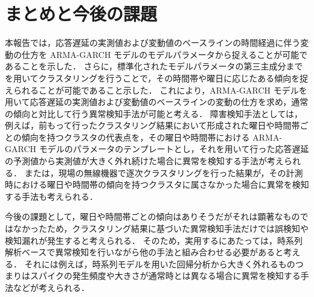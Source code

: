 \documentclass[technicalreport]{ieicej}
\begin{document}
\section{まとめと今後の課題}
本報告では，応答遅延の実測値および変動値のベースラインの時間経過に伴う変動の仕方を ARMA-GARCH モデルのモデルパラメータから捉えることが可能であることを示した．
さらに，標準化されたモデルパラメータの第三主成分までを用いてクラスタリングを行うことで，その時間帯や曜日に応じたある傾向を捉えられることが可能であること示した．
これにより，ARMA-GARCH モデルを用いて応答遅延の実測値および変動値のベースラインの変動の仕方を求め，通常の傾向と対比して行う異常検知手法が可能と考える．
障害検知手法としては，例えば，前もって行ったクラスタリング結果において形成された曜日や時間帯ごとの傾向を持つクラスタの代表点を，その曜日や時間帯における ARMA-GARCH モデルのパラメータのテンプレートとし，それを用いて行った応答遅延の予測値から実測値が大きく外れ続けた場合に異常を検知する手法が考えられる．
または，現場の無線機器で逐次クラスタリングを行った結果が，その計測時における曜日や時間帯の傾向を持つクラスタに属さなかった場合に異常を検知する手法も考えられる．

今後の課題として，曜日や時間帯ごとの傾向はありそうだがそれは顕著なものではなかったため，クラスタリング結果に基づいた異常検知手法だけでは誤検知や検知漏れが発生すると考えられる．
そのため，実用するにあたっては，時系列解析ベースで異常検知を行いながら他の手法と組み合わせる必要があると考える．
それには例えば，時系列モデルを用いた回帰分析から大きく外れるものつまりはスパイクの発生頻度や大きさが通常時とは異なる場合に異常を検知する手法などが考えられる．



\end{document}
